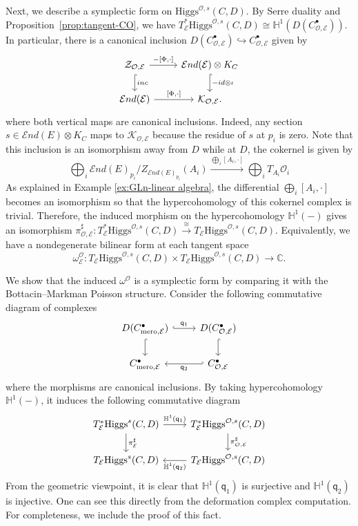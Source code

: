 \documentclass[11pt]{amsart}
\theoremstyle{plain}
\theoremstyle{definition}
\theoremstyle{remark}
\newcommand{\C}{\mathbb C}
\newcommand{\End}{\mathcal E nd}
\newcommand{\HH}{\mathbb H}
\newcommand{\cO}{\mathcal O}
\newcommand{\Higgs}{\mathrm{Higgs}}
\def\C{\mathbb{C}}
\begin{document}
Next, we describe a symplectic form on $\Higgs^{\cO,s}(C,D)$. By Serre duality and Proposition~\ref{prop:tangent-CO}, we have $T_{\mathcal E}^*\Higgs^{\cO,s}(C,D)\cong\HH^1(D(C_{\cO,\mathcal E}^\bullet))$. In particular, there is a canonical inclusion $D(C^\bullet_{\cO, \mathcal{E}}) \hookrightarrow C^\bullet_{\cO, \mathcal{E}}$ given by 
\begin{equation}\label{e:O serredual map}
\begin{tikzcd}
    \mathcal{Z}_{\cO, \mathcal{E}}
    \arrow[r, "{-[\Phi,\cdot]}"]
    \arrow[d, hook, "inc"]
    &
    \End(\mathcal E)\otimes K_C
    \arrow[d, hook, "-id \otimes \iota"]
    \\
    \End(\mathcal E)
    \arrow[r, "{[\Phi,\cdot]}"]
    &
    \mathcal{K}_{\cO,\mathcal{E}}.
\end{tikzcd}
\end{equation}
where both vertical maps are canonical inclusions. Indeed, any section $s \in \End(E)\otimes K_C$ maps to $\mathcal{K}_{\cO, \mathcal{E}}$ because the residue of $s$ at $p_i$ is zero. Note that this inclusion is an isomorphism away from $D$ while at $D$, the cokernel is given by 
\[
\bigoplus_i \End(E)_{p_i}/Z_{\End(E)_{p_i}}(A_i) \xrightarrow{\bigoplus_i[A_i, \cdot]} \bigoplus_i T_{A_i}\cO_i
\]
As explained in Example \ref{ex:GLn-linear algebra}, the differential $\bigoplus_i[A_i, \cdot]$ becomes an isomorphism so that the hypercohomology of this cokernel complex is trivial. Therefore, the induced morphism on the hypercohomology $\HH^1(-)$ gives an isomorphism $\pi^\sharp_{\cO,\mathcal{E}}:T_{\mathcal E}^*\Higgs^{\cO,s}(C,D)\xrightarrow{\cong} T_{\mathcal E}\Higgs^{\cO,s}(C,D)$. Equivalently, we have a nondegenerate bilinear form at each tangent space
\[
\omega^{\cO}_{\mathcal E}:
T_{\mathcal E}\Higgs^{\cO,s}(C,D)\times
T_{\mathcal E}\Higgs^{\cO,s}(C,D)
\longrightarrow \C.
\]

We show that the induced $\omega^\cO$ is a symplectic form by comparing it with the Bottacin--Markman Poisson structure. Consider the following commutative diagram of complexes
\[
\begin{tikzcd}
D(C_{\text{mero},\mathcal{E}}^\bullet) \arrow[r,hook, "\mathsf{q}_1"]\arrow[d,hook] & D(C_{\cO,\mathcal{E}}^\bullet) \arrow[d,hook] \\
C_{\text{mero},\mathcal{E}}^\bullet & C_{\cO,\mathcal{E}}^\bullet \arrow[l, hook', "\mathsf{q}_2"]
\end{tikzcd}
\]
where the morphisms are canonical inclusions. By taking hypercohomology $\HH^1(-)$, it induces the following commutative diagram 
\[
\begin{tikzcd}
T^*_\mathcal{E}\Higgs^{s}(C,D) \arrow[r,"\HH^1(\mathsf{q}_1)"] \arrow[d, "\pi^\sharp_{\mathcal{E}}"] & T^*_\mathcal{E}\Higgs^{\cO,s}(C,D) \arrow[d, "\pi^\sharp_{\cO,\mathcal{E}}"] \\
T_\mathcal{E}\Higgs^{s}(C,D) & T_\mathcal{E}\Higgs^{\cO,s}(C,D) \arrow[l,"\HH^1(\mathsf{q}_2)" ]
\end{tikzcd}
\]
From the geometric viewpoint, it is clear that $\HH^1(\mathsf{q}_1)$ is surjective and $\HH^1(\mathsf{q}_2)$ is injective. One can see this directly from the deformation complex computation. For completeness, we include the proof of this fact. 
\end{document}
